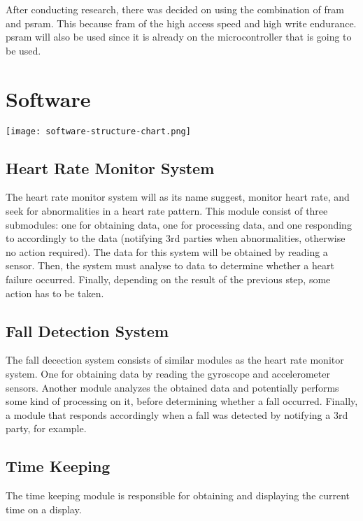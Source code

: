 \documentclass{article}
\begin{document}
After conducting research, there was decided on using the combination of \gls{fram} and \gls{psram}.
This because \gls{fram} of the high access speed and high write endurance.
\gls{psram} will also be used since it is already on the microcontroller that is going to be used.

\clearpage

\section{Software}

\texttt{[image: software-structure-chart.png]}

\subsection{Heart Rate Monitor System}

The heart rate monitor system will as its name suggest, monitor heart rate, and seek for abnormalities in a heart rate pattern.
This module consist of three submodules: one for obtaining data, one for processing data, and one responding to accordingly to the data (notifying 3rd parties when abnormalities, otherwise no action required).
The data for this system will be obtained by reading a sensor.
Then, the system must analyse to data to determine whether a heart failure occurred.
Finally, depending on the result of the previous step, some action has to be taken.

\subsection{Fall Detection System}

The fall decection system consists of similar modules as the heart rate monitor system.
One for obtaining data by reading the gyroscope and accelerometer sensors.
Another module analyzes the obtained data and potentially performs some kind of processing on it, before determining whether a fall occurred.
Finally, a module that responds accordingly when a fall was detected by notifying a 3rd party, for example.

\subsection{Time Keeping}

The time keeping module is responsible for obtaining and displaying the current time on a display.
\end{document}
